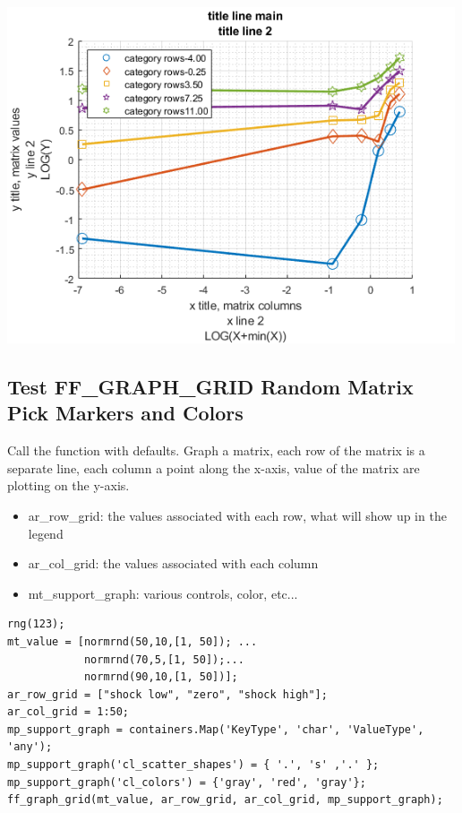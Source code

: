 \documentclass[
]{book}
\begin{document}
\includegraphics[width=5.20833in,height=\textheight]{img/fx_graph_grid_images/figure_1.png}

\hypertarget{test-ff_graph_grid-random-matrix-pick-markers-and-colors}{%
\subsection{Test FF\_GRAPH\_GRID Random Matrix Pick Markers and Colors}\label{test-ff_graph_grid-random-matrix-pick-markers-and-colors}}

Call the function with defaults. Graph a matrix, each row of the matrix
is a separate line, each column a point along the x-axis, value of the
matrix are plotting on the y-axis.

\begin{itemize}
\item
  ar\_row\_grid: the values associated with each row, what will show up
  in the legend
\item
  ar\_col\_grid: the values associated with each column
\item
  mt\_support\_graph: various controls, color, etc...
\end{itemize}

\begin{verbatim}
rng(123);
mt_value = [normrnd(50,10,[1, 50]); ...
            normrnd(70,5,[1, 50]);...
            normrnd(90,10,[1, 50])];
ar_row_grid = ["shock low", "zero", "shock high"];
ar_col_grid = 1:50;
mp_support_graph = containers.Map('KeyType', 'char', 'ValueType', 'any');
mp_support_graph('cl_scatter_shapes') = { '.', 's' ,'.' };
mp_support_graph('cl_colors') = {'gray', 'red', 'gray'};
ff_graph_grid(mt_value, ar_row_grid, ar_col_grid, mp_support_graph);
\end{verbatim}
\end{document}
